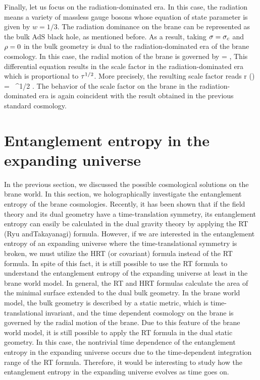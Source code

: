 \documentclass[12pt]{article}
\begin{document}
\begin{enumerate}
Finally, let us focus on the radiation-dominated era. In this case, the radiation means a variety of massless gauge bosons whose equation of state parameter is given by $w=1/3$. The radiation dominance on the brane can be represented as the bulk AdS black hole, as mentioned before. As a result, taking $\sigma=\sigma_c$ and $\rho=0$ in the bulk geometry is dual to the radiation-dominated era of the brane cosmology. In this case, the radial motion of the brane is governed by
\be
   =    ,
\ee
This differential equation results in the scale factor in the radiation-dominated era which is proportional to $\tau^{1/2}$. More precisely, the resulting scale factor reads
\be
r (\ta ) =   \ \ta^{1/2} .
\ee
The behavior of the scale factor on the brane in the radiation-dominated era is again coincident with the result obtained in the previous standard cosmology.

\end{enumerate}









\section{Entanglement entropy in the expanding universe}

In the previous section, we discussed the possible cosmological solutions on the brane world. In this section, we holographically investigate the entanglement entropy of the brane cosmologies. Recently, it has been shown that if the field theory and its dual geometry have a time-translation symmetry, its entanglement entropy can easily be calculated in the dual gravity theory by applying the RT (Ryu andTakayanagi) formula. However, if we are interested in the entanglement entropy of an expanding universe where the time-translational symmetry is broken, we must utilize the HRT (or covariant) formula instead of the RT formula. In spite of this fact, it is still possible to use the RT formula to understand the entanglement entropy of the expanding universe at least in the brane world model. In general, the RT and HRT formulas calculate the area of the minimal surface extended to the dual bulk geometry. In the brane world model, the bulk geometry is described by a static metric, which is time-translational invariant, and the time dependent cosmology on the brane is governed by the radial motion of the brane. Due to this feature of the brane world model, it is still possible to apply the RT formula in the dual static geometry. In this case, the nontrivial time dependence of the entanglement entropy in the expanding universe occurs due to the time-dependent integration range of the RT formula. Therefore, it would be interesting to study how the entanglement entropy in the expanding universe evolves as time goes on.
\end{document}

